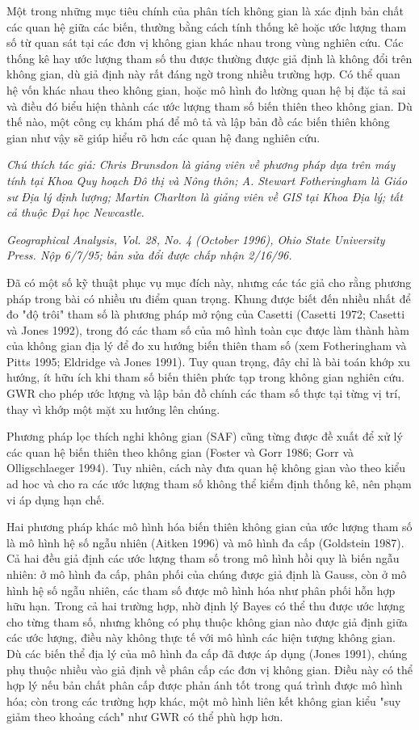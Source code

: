 Một trong những mục tiêu chính của phân tích không gian là xác định bản chất các quan hệ giữa các biến, thường bằng cách tính thống kê hoặc ước lượng tham số từ quan sát tại các đơn vị không gian khác nhau trong vùng nghiên cứu. Các thống kê hay ước lượng tham số thu được thường được giả định là không đổi trên không gian, dù giả định này rất đáng ngờ trong nhiều trường hợp. Có thể quan hệ vốn khác nhau theo không gian, hoặc mô hình đo lường quan hệ bị đặc tả sai và điều đó biểu hiện thành các ước lượng tham số biến thiên theo không gian. Dù thế nào, một công cụ khám phá để mô tả và lập bản đồ các biến thiên không gian như vậy sẽ giúp hiểu rõ hơn các quan hệ đang nghiên cứu.

\emph{Chú thích tác giả: Chris Brunsdon là giảng viên về phương pháp dựa trên máy tính tại Khoa Quy hoạch Đô thị và Nông thôn; A. Stewart Fotheringham là Giáo sư Địa lý định lượng; Martin Charlton là giảng viên về GIS tại Khoa Địa lý; tất cả thuộc Đại học Newcastle.}

\emph{Geographical Analysis, Vol. 28, No. 4 (October 1996), Ohio State University Press. Nộp 6/7/95; bản sửa đổi được chấp nhận 2/16/96.}

Đã có một số kỹ thuật phục vụ mục đích này, nhưng các tác giả cho rằng phương pháp trong bài có nhiều ưu điểm quan trọng. Khung được biết đến nhiều nhất để đo "độ trôi" tham số là phương pháp mở rộng của Casetti (Casetti 1972; Casetti và Jones 1992), trong đó các tham số của mô hình toàn cục được làm thành hàm của không gian địa lý để đo xu hướng biến thiên tham số (xem Fotheringham và Pitts 1995; Eldridge và Jones 1991). Tuy quan trọng, đây chỉ là bài toán khớp xu hướng, ít hữu ích khi tham số biến thiên phức tạp trong không gian nghiên cứu. GWR cho phép ước lượng và lập bản đồ chính các tham số thực tại từng vị trí, thay vì khớp một mặt xu hướng lên chúng.

Phương pháp lọc thích nghi không gian (SAF) cũng từng được đề xuất để xử lý các quan hệ biến thiên theo không gian (Foster và Gorr 1986; Gorr và Olligschlaeger 1994). Tuy nhiên, cách này đưa quan hệ không gian vào theo kiểu ad hoc và cho ra các ước lượng tham số không thể kiểm định thống kê, nên phạm vi áp dụng hạn chế.

Hai phương pháp khác mô hình hóa biến thiên không gian của ước lượng tham số là mô hình hệ số ngẫu nhiên (Aitken 1996) và mô hình đa cấp (Goldstein 1987). Cả hai đều giả định các ước lượng tham số trong mô hình hồi quy là biến ngẫu nhiên: ở mô hình đa cấp, phân phối của chúng được giả định là Gauss, còn ở mô hình hệ số ngẫu nhiên, các tham số được mô hình hóa như phân phối hỗn hợp hữu hạn. Trong cả hai trường hợp, nhờ định lý Bayes có thể thu được ước lượng cho từng tham số, nhưng không có phụ thuộc không gian nào được giả định giữa các ước lượng, điều này không thực tế với mô hình các hiện tượng không gian. Dù các biến thể địa lý của mô hình đa cấp đã được áp dụng (Jones 1991), chúng phụ thuộc nhiều vào giả định về phân cấp các đơn vị không gian. Điều này có thể hợp lý nếu bản chất phân cấp được phản ánh tốt trong quá trình được mô hình hóa; còn trong các trường hợp khác, một mô hình liên kết không gian kiểu "suy giảm theo khoảng cách" như GWR có thể phù hợp hơn.

